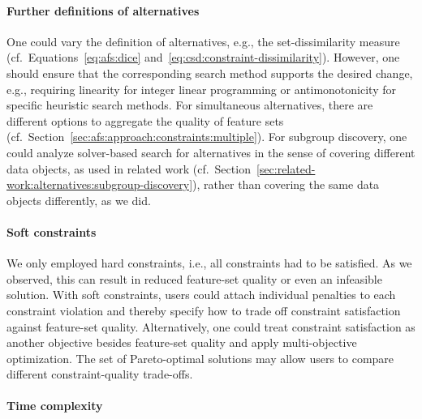\paragraph{Further definitions of alternatives}

One could vary the definition of alternatives, e.g., the set-dissimilarity measure (cf.~Equations~\ref{eq:afs:dice} and~\ref{eq:csd:constraint-dissimilarity}).
However, one should ensure that the corresponding search method supports the desired change, e.g., requiring linearity for integer linear programming or antimonotonicity for specific heuristic search methods. 
For simultaneous alternatives, there are different options to aggregate the quality of feature sets (cf.~Section~\ref{sec:afs:approach:constraints:multiple}).
For subgroup discovery, one could analyze solver-based search for alternatives in the sense of covering different data objects, as used in related work (cf.~Section~\ref{sec:related-work:alternatives:subgroup-discovery}), rather than covering the same data objects differently, as we did.

\paragraph{Soft constraints}

We only employed hard constraints, i.e., all constraints had to be satisfied.
As we observed, this can result in reduced feature-set quality or even an infeasible solution.
With soft constraints, users could attach individual penalties to each constraint violation and thereby specify how to trade off constraint satisfaction against feature-set quality.
Alternatively, one could treat constraint satisfaction as another objective besides feature-set quality and apply multi-objective optimization.
The set of Pareto-optimal solutions may allow users to compare different constraint-quality trade-offs.

\paragraph{Time complexity}

